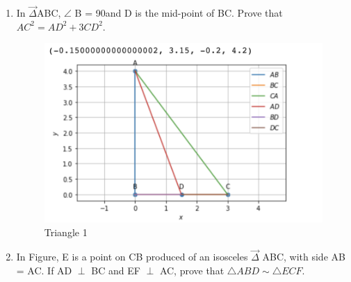 \documentclass[journal,12pt,twocolumn]{IEEEtran}
\renewcommand\thesection{\arabic{section}}
\begin{document}
\begin{enumerate}[label=\thesection.\arabic*.,ref=\thesection.\theenumi]
\item In $\vec{\Delta}$ABC, $\angle$ B = 90\textdegree\;and D is the mid-point of BC. Prove that
$AC^2 = AD^2 + 3CD^2$.\\
\begin{table}[ht]
 \centering
 \caption{}
 \end{table}
  \begin{figure}
	  \centering 
	  \includegraphics[width=\columnwidth]{tri1}
	  \caption{Triangle 1}
	  \label{fig:geometry-3.9.pdf}
  \end{figure}
\item In Figure, E is a point on CB produced of an isosceles $\vec{\Delta}$ ABC, with side
AB = AC. If AD $\perp$ BC and EF $\perp$ AC, prove that $\triangle ABD \sim \triangle ECF$.
\begin{table}[ht]
 \centering
\end{table}
\end{enumerate}
\end{document}

